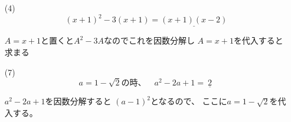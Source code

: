 \documentclass[12pt,b5paper]{ltjsarticle}
\begin{document}
\begin{itemize}
 \item[(4)]
           \begin{equation}
            (x+1)^2-3(x+1) = \underline{(x+1)(x-2)}
           \end{equation}


           $A=x+1$と置くと$A^2-3A$なのでこれを因数分解し
           $A=x+1$を代入すると求まる

 \item[(7)]
           \begin{equation}
            a=1-\sqrt{2}の時、 \quad a^2-2a+1 = \underline{\ 2\ }
           \end{equation}


           $a^2-2a+1$を因数分解すると
           $(a-1)^2$となるので、
           ここに$a=1-\sqrt{2}$を代入する。
\end{itemize}
\end{document}
